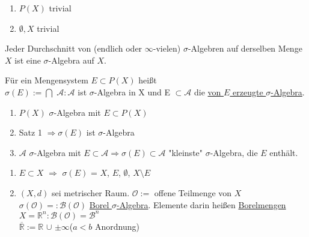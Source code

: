 \documentclass[11pt]{memoir}
\begin{document}
\begin{Beispiel}
\begin{enumerate}
	\item $P(X)$ trivial
	\item \textbraceleft$ \emptyset, X $\textbraceright{} trivial
\end{enumerate}
\end{Beispiel}

\begin{Satz}
Jeder Durchschnitt von (endlich oder $\infty$-vielen) $\sigma$-Algebren auf derselben Menge $X$ ist eine $\sigma$-Algebra auf $X$.
\end{Satz}

\begin{Definition}
Für ein Mengensystem $E \subset P(X)$ heißt \\
$\sigma(E):=\bigcap$ \textbraceleft $\mathscr{A}: \mathscr{A}$ ist $\sigma$-Algebra in X und E $ \subset \mathscr{A}$\textbraceright {} die \underline{ von $E$ erzeugte $\sigma$-Algebra}.
\end{Definition}

\begin{Bemerkung}
\begin{enumerate}
	\item $P(X)$ $\sigma$-Algebra mit $E \subset P(X)$
	\item Satz 1 $\Rightarrow \sigma(E)$ ist $\sigma$-Algebra
	\item $\mathscr{A}$ $\sigma$-Algebra mit $E \subset \mathscr{A} \Rightarrow \sigma(E) \subset 		\mathscr{A}$ "kleinste"{} $\sigma$-Algebra, die $E$ enthält.
\end{enumerate}
\end{Bemerkung}

\begin{Beispiel}
\begin{enumerate}
	\item $E \subset X$ $\Rightarrow $ $\sigma(E)$ = \textbraceleft $X$, $E$, $\emptyset$, $X \setminus E$\textbraceright
	\item $(X, d)$ sei metrischer Raum. $\mathscr{O}:=$ \textbraceleft offene Teilmenge von $X$ \\
	$\sigma(\mathscr{O})=:\mathscr{B(O)}$ \underline{Borel $\sigma$-Algebra}. Elemente darin heißen \underline{Borelmengen} \\
	$X = \mathbb{R}^{n}: \mathscr{B(O)} = \mathscr{B}^{n}$ \\
	$\overline{\mathbb{R}} := \mathbb{R}$  $\cup$ \textbraceleft$\pm\infty$\textbraceright {}($a < b$ Anordnung)
\end{enumerate}
\end{Beispiel}
\end{document}
